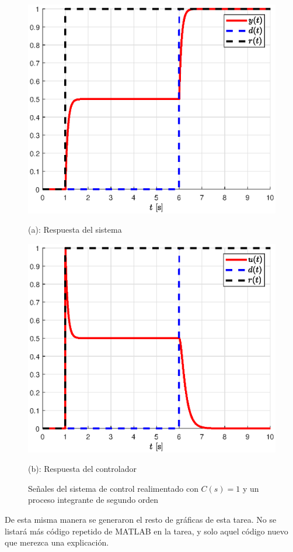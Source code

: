 \begin{itemize}
\begin{figure}[!h]
    \centering
    \begin{minipage}{0.45\linewidth}
        \includegraphics[width=\linewidth]{figs/fig2.eps}
        \caption*{(a): Respuesta del sistema}
    \end{minipage}
    \begin{minipage}{0.45\linewidth}
        \includegraphics[width=\linewidth]{figs/fig3.eps}
        \caption*{(b): Respuesta del controlador}
    \end{minipage}
    \caption{Señales del sistema de control realimentado con $C(s) = 1$ y un proceso integrante de segundo orden}
    \label{fig3}
\end{figure}
De esta misma manera se generaron el resto de gráficas de esta tarea. No se listará más código repetido de MATLAB en la tarea, y solo aquel código nuevo que merezca una explicación.
\end{itemize}

